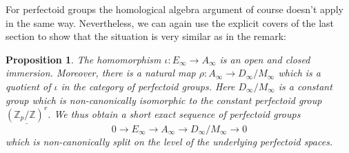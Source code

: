 \documentclass[10pt,oneside]{amsart}
\newtheorem{proposition}[theorem]{Proposition}
\theoremstyle{definition}
\theoremstyle{remark}
\begin{document}
	For perfectoid groups the homological algebra argument of course doesn't apply in the same way. Nevertheless, we can again use the explicit covers of the last section to show that the situation is very similar as in the remark:
	\begin{proposition}\label{the morphism E->A in the limit}
		The homomorphism $\iota:E_\infty \rightarrow A_\infty$ is an open and closed immersion. Moreover, there is a natural map $\rho:A_\infty \rightarrow D_\infty/M_\infty$ which is a quotient of $\iota$ in the category of perfectoid groups. Here $D_\infty/M_\infty$ is a constant group which is non-canonically isomorphic to the constant perfectoid group $\underline{(\mathbb Z_p/\mathbb Z)^r}$. We thus obtain a short exact sequence of perfectoid groups
		\[0\rightarrow E_\infty \rightarrow A_\infty \rightarrow D_\infty/M_\infty\rightarrow 0\]
		which is non-canonically split on the level of the underlying perfectoid spaces.
	\end{proposition}
\end{document}
